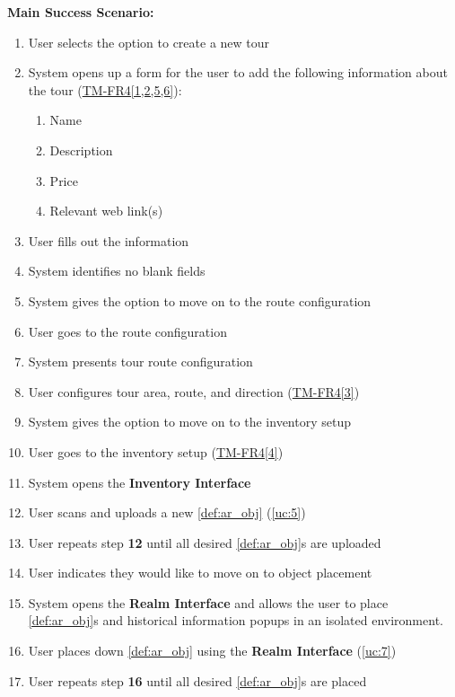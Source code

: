 \documentclass{article}
\begin{document}
\begin{enumerate}[label=\textbf{UC\arabic*}]
        \textbf{Main Success Scenario:}
        \begin{enumerate}[label=\textbf{\arabic*.}]
            \item User selects the option to create a new tour
            \item System opens up a form for the user to add the following information about the tour (\hyperref[ssub:tour_management]{TM-FR4[1,2,5,6]}):
            \begin{enumerate}
                \item Name
                \item Description
                \item Price
                \item Relevant web link(s)
            \end{enumerate}
            \item User fills out the information
            \item System identifies no blank fields
            \item System gives the option to move on to the route configuration
            \item User goes to the route configuration
            \item System presents tour route configuration
            \item User configures tour area, route, and direction (\hyperref[ssub:tour_management]{TM-FR4[3]})
            \item System gives the option to move on to the inventory setup
            \item User goes to the inventory setup (\hyperref[ssub:tour_management]{TM-FR4[4]})
            \item System opens the \textbf{Inventory Interface}
            \item User scans and uploads a new \ref{def:ar_obj} (\ref{uc:5})
            \item User repeats step \textbf{12} until all desired \ref{def:ar_obj}s are uploaded
            \item User indicates they would like to move on to object placement
            \item System opens the \textbf{Realm Interface} and allows the user to place \ref{def:ar_obj}s and historical information popups in an isolated environment.
            \item User places down \ref{def:ar_obj} using the \textbf{Realm Interface} (\ref{uc:7})
            \item User repeats step \textbf{16} until all desired \ref{def:ar_obj}s are placed

\end{enumerate}
\end{enumerate}
\end{document}
